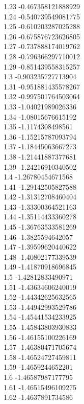 {1.23	-0.467358121888929\\
1.24	-0.540739549081775\\
1.25	-0.610203287025288\\
1.26	-0.675876723626805\\
1.27	-0.737888174019762\\
1.28	-0.796366297710012\\
1.29	-0.851439558315257\\
1.3	-0.903235727713904\\
1.31	-0.951881435578267\\
1.32	-0.997501764503064\\
1.33	-1.04021989026336\\
1.34	-1.08015676615192\\
1.35	-1.1174308498561\\
1.36	-1.15215787093794\\
1.37	-1.18445063667273\\
1.38	-1.21441887377681\\
1.39	-1.24216910340502\\
1.4	-1.26780454671568\\
1.41	-1.29142505827588\\
1.42	-1.31312708460404\\
1.43	-1.33300364521163\\
1.44	-1.35114433360278\\
1.45	-1.36763533581269\\
1.46	-1.3825594642057\\
1.47	-1.39599620440622\\
1.48	-1.40802177339539\\
1.49	-1.41870918696845\\
1.5	-1.42812833490971\\
1.51	-1.43634606240019\\
1.52	-1.44342625632565\\
1.53	-1.44942993529786\\
1.54	-1.45441534233925\\
1.55	-1.45843803930833\\
1.56	-1.46155100226169\\
1.57	-1.46380471705674\\
1.58	-1.46524727459811\\
1.59	-1.4659244652201\\
1.6	-1.46587987177795\\
1.61	-1.46515496109275\\
1.62	-1.4637891734586\\
}
